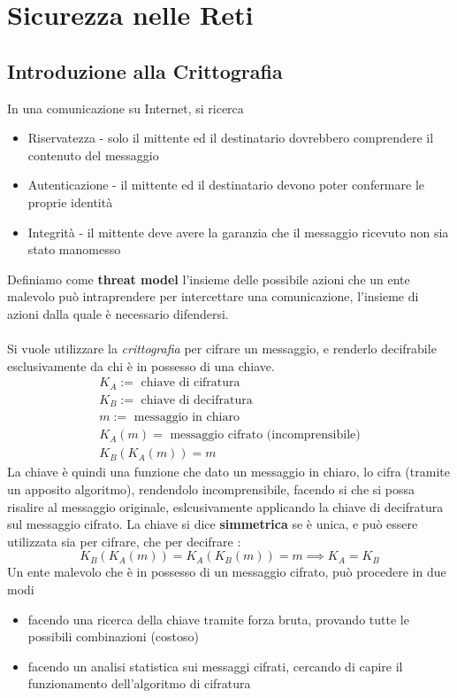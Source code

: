 \documentclass[12pt, letterpaper]{article}
\newcommand{\acc}{\\\hphantom{}\\}
\begin{document}
\section{Sicurezza nelle Reti}
\subsection{Introduzione alla Crittografia}
In una comunicazione su Internet, si ricerca\begin{itemize}
    \item Riservatezza - solo il mittente ed il destinatario dovrebbero comprendere il contenuto del messaggio 
    \item Autenticazione - il mittente ed il destinatario devono poter confermare le proprie identità 
    \item Integrità - il mittente deve avere la garanzia che il messaggio ricevuto non sia stato manomesso 
\end{itemize}
Definiamo come \textbf{threat model} l'insieme delle possibile azioni che un ente malevolo può intraprendere 
per intercettare una comunicazione, l'insieme di azioni dalla quale è necessario difendersi.\acc 
Si vuole utilizzare la \textit{crittografia} per cifrare un messaggio, e renderlo decifrabile esclusivamente da chi 
è in possesso di una chiave.$$ \begin{matrix}
    K_A := \text{ chiave di cifratura}\\ 
    K_B := \text{ chiave di decifratura}\\ 
    m := \text{ messaggio in chiaro} \\ 
    K_A(m) = \text{ messaggio cifrato (incomprensibile)}\\ 
    K_B(K_A(m))=m
\end{matrix}$$
La chiave è quindi una funzione che dato un messaggio in chiaro, lo cifra (tramite un apposito algoritmo), rendendolo incomprensibile, facendo si che 
si possa risalire al messaggio originale, eslcusivamente applicando la chiave di decifratura sul messaggio cifrato. La 
chiave si dice \textbf{simmetrica} se è unica, e può essere utilizzata sia 
per cifrare, che per decifrare : $$ K_B(K_A(m))=K_A(K_B(m))=m \implies K_A = K_B$$
Un ente malevolo che è in possesso di un messaggio cifrato, può procedere in due modi \begin{itemize}
    \item facendo una ricerca della chiave tramite forza bruta, provando tutte le possibili combinazioni (costoso)
    \item facendo un analisi statistica sui messaggi cifrati, cercando di capire il funzionamento dell'algoritmo di cifratura
\end{itemize}
\end{document}
